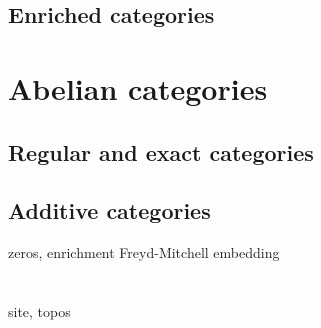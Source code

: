 \documentclass{../../large}
\begin{document}
\section{Enriched categories}


\chapter{Abelian categories}
\section{Regular and exact categories}
\section{Additive categories}
zeros, enrichment
Freyd-Mitchell embedding

\chapter{}
site, topos
\end{document}
